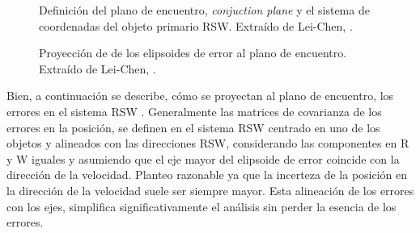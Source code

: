 \begin{figure}[!h]
\begin{minipage}[t]{0.48\textwidth}
 \centering
 \caption[Plano de encuentro y proyecci\'on del sistema RSW]{Definici\'on del plano de encuentro, {\it{conjuction plane}} y el sistema de coordenadas del objeto primario RSW. Extra\'ido de Lei-Chen, \citep{leichen}.}
 \label{fig:pocplano}
\end{minipage}
\begin{minipage}[t]{0.48\textwidth}
 \centering
 \caption[Proyecci\'on de los elipsoides de error al plano de encuentro]{Proyecci\'on de de los elipsoides de error al plano de encuentro. Extra\'ido de Lei-Chen, \citep{leichen}.}
\label{fig:pochorizontal}
\end{minipage}
\end{figure}

Bien, a continuaci\'on se describe, c\'omo se proyectan al plano de encuentro, los errores en el sistema RSW .
Generalmente las matrices de covarianza de los errores en la posici\'on, se definen en el sistema RSW centrado en uno de los objetos y alineados con las direcciones RSW, considerando las componentes en R y W iguales y asumiendo que el eje mayor del elipsoide de error coincide con la direcci\'on de la velocidad. Planteo razonable ya que la incerteza de la posici\'on en la direcci\'on de la velocidad suele ser siempre mayor. Esta alineaci\'on de los errores con los ejes, simplifica significativamente el an\'alisis sin perder la esencia de los errores. 

